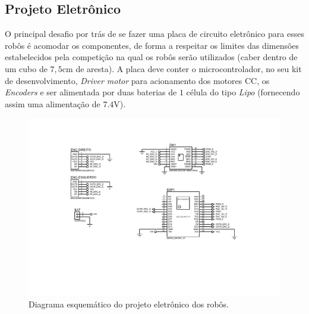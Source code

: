 \subsection{Projeto Eletrônico}
\label{subsec:pro_eletronico}


O principal desafio por trás de se fazer uma placa de circuito eletrônico para esses robôs é acomodar os componentes, de forma a respeitar os limites das dimensões estabelecidos pela competição na qual os robôs serão utilizados (caber dentro de um cubo de $7,5$cm de aresta). A placa deve conter o microcontrolador, no seu kit de desenvolvimento, \textit{Driver motor} para acionamento dos motores CC, os \textit{Encoders} e ser alimentada por duas baterias de $1$ célula do tipo \textit{Lipo} (fornecendo assim uma alimentação de $7.4$V).\\


\begin{figure}[H]
    \centering
    \includegraphics[width=\textwidth]{figuras/eletronica/placa/esquematico_completo.pdf}
    \caption{Diagrama esquemático do projeto eletrônico dos robôs.}
    \label{fig:diagrama_esquematico}
\end{figure}

